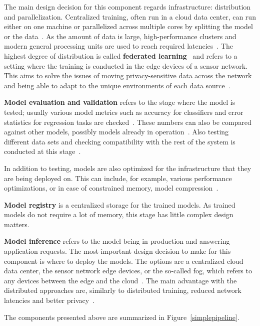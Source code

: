 The main design decision for this component regards infrastructure: distribution and parallelization. Centralized training, often run in a cloud data center, can run either on one machine or parallelized across multiple cores by splitting the model or the data~\cite{ben-nunDemystifyingParallelDistributed2019}. As the amount of data is large, high-performance clusters and modern general processing units are used to reach required latencies~\cite{iotsurvey}. The highest degree of distribution is called \textbf{federated learning}~\cite{iotsurvey} and refers to a setting where the training is conducted in the edge devices of a sensor network. This aims to solve the issues of moving privacy-sensitive data across the network and being able to adapt to the unique environments of each data source~\cite{iotsurvey}.

\textbf{Model evaluation and validation} refers to the stage where the model is tested; usually various model metrics such as accuracy for classifiers and error statistics for regression tasks are checked~\cite{iotsurvey}. These numbers can also be compared against other models, possibly models already in operation~\cite{googlemlops}. Also testing different data sets and checking compatibility with the rest of the system is conducted at this stage~\cite{googlemlops}.

In addition to testing, models are also optimized for the infrastructure that they are being deployed on. This can include, for example, various performance optimizations, or in case of constrained memory, model compression~\cite{iotsurvey}.

\textbf{Model registry} is a centralized storage for the trained models. As trained models do not require a lot of memory, this stage has little complex design matters.

\textbf{Model inference} refers to the model being in production and answering application requests.
The most important design decision to make for this component is where to deploy the models. The options are a centralized cloud data center, the sensor network edge devices, or the so-called fog, which refers to any devices between the edge and the cloud~\cite{fogsurvey}. The main advantage with the distributed approaches are, similarly to distributed training, reduced network latencies and better privacy~\cite{szeEfficientProcessingDeep2017}.

The components presented above are summarized in Figure~\ref{simplepipeline}.

